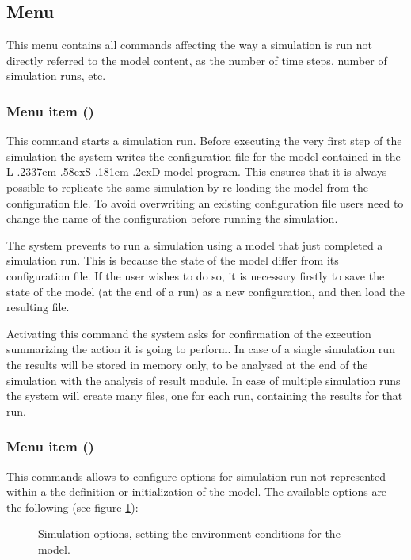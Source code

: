 \documentclass [11pt,a4paper] {book}
\def\LsD{{L\kern-.2337em\lower-.58ex\hbox{S}\kern-.181em\lower-.2ex\hbox{D}}\xspace}
\begin{document}
\subsection{Menu }
This menu contains all commands affecting the way a simulation is run not directly referred to the model content, as the number of time steps, number of simulation runs, etc.  


\subsubsection{Menu item  ()}

This command starts a simulation run. Before executing the very first step of the simulation the system writes the configuration file for the model contained in the \LsD model program. This ensures that it is always possible to replicate the same simulation by re-loading the model from the configuration file. To avoid overwriting an existing configuration file users need to change the name of the configuration before running the simulation.

The system prevents to run a simulation using a model that just completed a simulation run. This is because the state of the model differ from its configuration file. If the user wishes to do so, it is necessary firstly to save the state of the model (at the end of a run) as a new configuration, and then load the resulting file.

Activating this command the system asks for confirmation of the execution summarizing the action it is going to perform. In case of a single simulation run the results will be stored in memory only, to be analysed at the end of the simulation with the analysis of result module. In case of multiple simulation runs the system will create many files, one for each run, containing the results 
 for that run.
 
\subsubsection{Menu item  ()}

This commands allows to configure options for simulation run not represented within a the definition or initialization of the model. The available options are the following (see figure \ref{fig:simset}):

\begin{figure}[ht]
  \centering
  \caption{Simulation options, setting the environment conditions for the model.}
  \label{fig:simset}
\end{figure}
\end{document}
